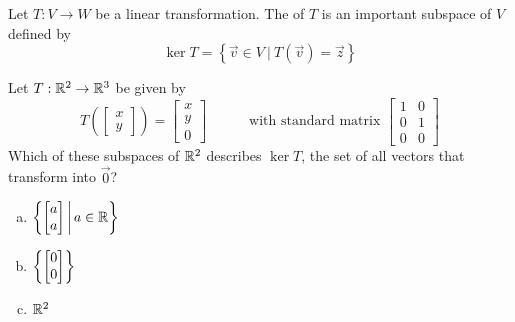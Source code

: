 \begin{applicationActivities}
\begin{definition}
Let $T: V \rightarrow W$ be a linear transformation.  The  of $T$
is an important subspace of \(V\) defined by
\[
\ker T = \left\{ \vec{v} \in V\ \big|\ T(\vec{v})=\vec{z}\right\}
\]

\begin{center}
\end{center}
\end{definition}

\begin{activity}{5}
Let $T: \mathbb{R}^2 \rightarrow \mathbb{R}^3$ be given by
\[
  T\left(\begin{bmatrix}x \\ y \end{bmatrix} \right)
    =
  \begin{bmatrix} x \\ y \\ 0 \end{bmatrix}
    \hspace{3em}
    \text{with standard matrix }
  \begin{bmatrix} 1 & 0 \\ 0 & 1 \\ 0 & 0 \end{bmatrix}
\]
Which of these subspaces of \(\mathbb{R}^2\) describes \(\ker T\),
the set of all vectors that transform into \(\vec 0\)?
\begin{enumerate}[a)]
\item \(\left\{\begin{bmatrix}a \\ a\end{bmatrix}\,\middle|\,a\in\mathbb{R}\right\}\)
\item \(\left\{\begin{bmatrix}0\\0\end{bmatrix}\right\}\)
\item \(\mathbb{R}^2\)
\end{enumerate}
\end{activity}


\end{applicationActivities}
